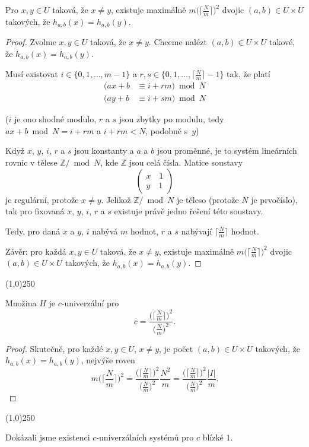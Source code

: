 \documentclass[a4paper,12pt]{article}
\newenvironment{myproof}{
  \begin{proof}
    
  }{
  \end{proof}
  \begin{center}
   \line(1,0){250}
   \end{center}
  }
\begin{document}
\begin{lemma}
    Pro $x,y\in U$ taková, že $x\ne y$, existuje maximálně $m\big(\lceil\frac Nm\rceil\big)^2$ dvojic $(a
    ,b)\in U\times U$ takových, že 
    $h_{a,b}(x)=h_{a,b}(y)$.
\end{lemma}
\begin{myproof}
Zvolme $x,y\in U$ taková, že $x\ne y$. Chceme nalézt 
$(a,b)\in U\times U$ takové, že $h_{a,b}(x)=h_{a,b}(y)$. 

Musí existovat $i\in \{0,1,\dots,m-1\}$ a 
$r,s\in \{0,1,\dots,\lceil\frac Nm\rceil -1\}$ tak, že platí
\begin{align*}(ax+b&\equiv i+rm)\bmod N\\
(ay+b&\equiv i+sm)\bmod N\end{align*}

($i$ je ono shodné modulo, $r$ a $s$ jsou zbytky po modulu, tedy $ax+b\bmod N=i+rm$ a $i+rm<N$, podobně s~$y$)

Když $x$, $y$, $i$, $r$ a $s$ jsou konstanty a $a$ a $b$ jsou 
proměnné, je to systém lineárních rovnic v tělese 
$\mathbb Z/\bmod N$, kde $\mathbb Z$ jsou celá čísla. Matice soustavy  
$$\begin{pmatrix} x\quad 1\\
y\quad 1\end{pmatrix} $$
je regulární, protože $x\ne y$. Jelikož $\mathbb Z/\bmod N$ je těleso (protože $N$ je prvočíslo), tak 
 pro fixovaná $x$, $y$, $i$, $r$ a $s$ existuje právě jedno řešení této soustavy.


Tedy, pro daná $x$ a $y$, $i$ nabývá $m$ hodnot, $r$ a $s$ nabývají 
$\lceil\frac Nm\rceil$ hodnot. 

Závěr: pro každá $x,y\in U$ taková, že 
$x\ne y$, existuje maximálně $m\big(\lceil\frac Nm\rceil\big)^2$ dvojic $(a
,b)\in U\times U$ takových, že 
$h_{a,b}(x)=h_{a,b}(y)$.
\end{myproof}

\begin{veta}Množina $H$ je $c$-univerzální pro 
$$c=\frac {\big(\lceil\frac Nm\rceil\big)^2}{\big(\frac Nm\big)^2}
.$$
\end{veta}
\begin{myproof}
Skutečně, pro každé $x,y\in U$, $x\ne y$, je počet 
$(a,b)\in U\times U$ takových, že $h_{a,b}(x)=h_{a,b}(y)$, nejvýše roven
$$m\big(\lceil\frac Nm\rceil\big)^2=\frac {\big(\lceil\frac Nm\rceil\big
)^2}{\big(\frac Nm\big)^2}\frac {N^2}m=\frac {\big(\lceil\frac Nm
\rceil\big)^2}{\big(\frac Nm\big)^2}\frac {|I|}m.$$
\end{myproof}
\begin{pozorovani}
Dokázali jsme existenci $c$-univerzálních 
systémů pro $c$ blízké $1$. 
\end{pozorovani}
\end{document}
